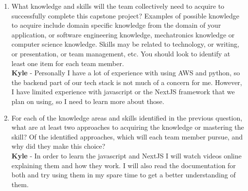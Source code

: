 \documentclass[12pt]{article}
\begin{document}
\begin{enumerate}
  \item What knowledge and skills will the team collectively need to acquire to
  successfully complete this capstone project?  Examples of possible knowledge
  to acquire include domain specific knowledge from the domain of your
  application, or software engineering knowledge, mechatronics knowledge or
  computer science knowledge.  Skills may be related to technology, or writing,
  or presentation, or team management, etc.  You should look to identify at
  least one item for each team member. \\
  \textbf{Kyle} - Personally I have a lot of experience with using AWS and python,
  so the backend part of our tech stack is not much of a concern for me. However,
  I have limited experience with javascript or the NextJS framework that we plan
  on using, so I need to learn more about those.
  \item For each of the knowledge areas and skills identified in the previous
  question, what are at least two approaches to acquiring the knowledge or
  mastering the skill?  Of the identified approaches, which will each team
  member pursue, and why did they make this choice? \\
  \textbf{Kyle} - In order to learn the javascript and NextJS I will watch videos
  online explaining them and how they work. I will also read the documentation for
  both and try using them in my spare time to get a better understanding of them.
\end{enumerate}
\end{document}
